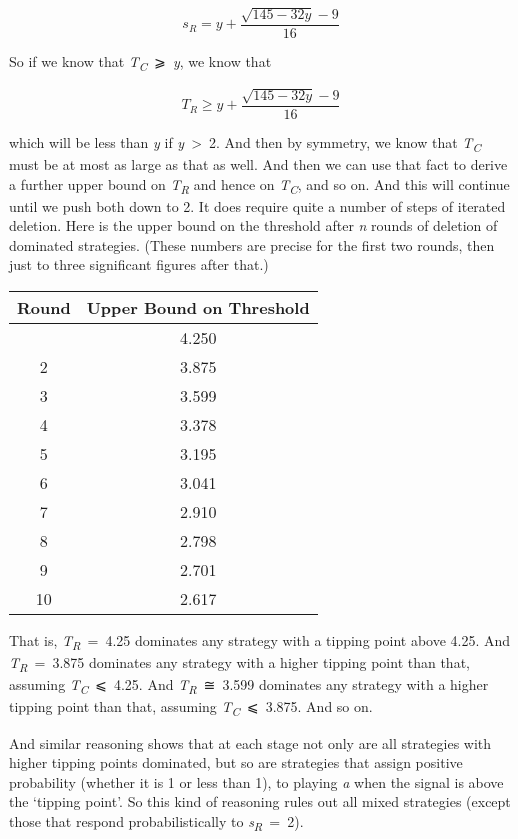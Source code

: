 \documentclass[
  10pt,
  letterpaper,
  DIV=11,
  numbers=noendperiod,
  twoside]{scrartcl}
\begin{document}
\[ 
s_R = y + \frac{\sqrt{145-32y} - 9}{16}
\]

So if we know that \emph{T\textsubscript{C}}~⩾~\emph{y}, we know that

\[
T_R \geqslant y + \frac{\sqrt{145-32y} - 9}{16}
\]

which will be less than \emph{y} if \emph{y}~\textgreater~2. And then by
symmetry, we know that \emph{T\textsubscript{C}} must be at most as
large as that as well. And then we can use that fact to derive a further
upper bound on \emph{T\textsubscript{R}} and hence on
\emph{T\textsubscript{C}}, and so on. And this will continue until we
push both down to 2. It does require quite a number of steps of iterated
deletion. Here is the upper bound on the threshold after \emph{n} rounds
of deletion of dominated strategies. (These numbers are precise for the
first two rounds, then just to three significant figures after that.)

\begin{longtable}[]{@{}cc@{}}
\toprule\noalign{}
Round & Upper Bound on Threshold \\
\midrule\noalign{}
\endhead
\bottomrule\noalign{}
\endlastfoot
1 & 4.250 \\
2 & 3.875 \\
3 & 3.599 \\
4 & 3.378 \\
5 & 3.195 \\
6 & 3.041 \\
7 & 2.910 \\
8 & 2.798 \\
9 & 2.701 \\
10 & 2.617 \\
\end{longtable}

That is, \emph{T\textsubscript{R}}~=~4.25 dominates any strategy with a
tipping point above 4.25. And \emph{T\textsubscript{R}}~=~3.875
dominates any strategy with a higher tipping point than that, assuming
\emph{T\textsubscript{C}}~⩽~4.25. And \emph{T\textsubscript{R}}~≅~3.599
dominates any strategy with a higher tipping point than that, assuming
\emph{T\textsubscript{C}}~⩽~3.875. And so on.

And similar reasoning shows that at each stage not only are all
strategies with higher tipping points dominated, but so are strategies
that assign positive probability (whether it is 1 or less than 1), to
playing \emph{a} when the signal is above the `tipping point'. So this
kind of reasoning rules out all mixed strategies (except those that
respond probabilistically to \emph{s\textsubscript{R}}~=~2).
\end{document}
